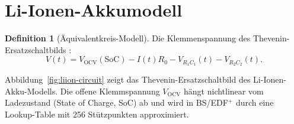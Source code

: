 ﻿\documentclass[a4paper,12pt]{scrreprt}
\theoremstyle{definition}
\newtheorem{definition}{Definition}[chapter]
\begin{document}
	\section{Li-Ionen-Akkumodell}

	\begin{definition}[Äquivalentkreis-Modell]
		Die Klemmenspannung des Thevenin-Ersatz\-schaltbilds \cite{Epp2026liionp}:
		\[
		V(t) = V_{\mathrm{OCV}}(\mathrm{SoC}) - I(t) R_0 - V_{R_1 C_1}(t) - V_{R_2 C_2}(t).
		\]
	\end{definition}

	Abbildung~\ref{fig:liion-circuit} zeigt das Thevenin-Ersatzschaltbild
	des Li-Ionen-Akku-Modells. Die offene Klemmspannung $V_{\mathrm{OCV}}$ hängt
	nichtlinear vom Ladezustand (State of Charge, SoC) ab und wird in BS/EDF$^+$
	durch eine Lookup-Table mit 256 Stützpunkten approximiert.
\end{document}
